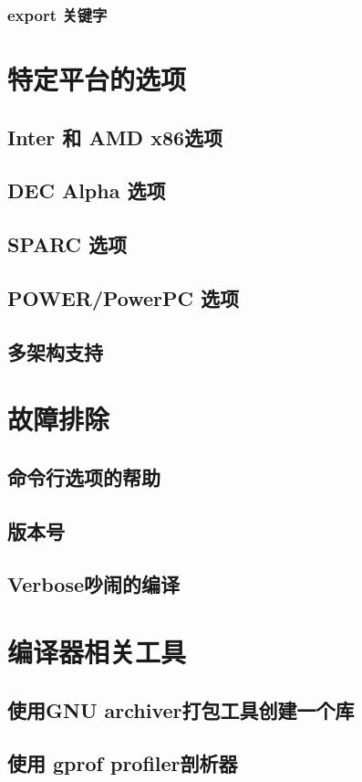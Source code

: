 \documentclass[lang=cn,10pt,newtx,scheme=chinese]{elegantbook}
\begin{document}
\subsection{export 关键字}

\chapter{特定平台的选项}
\section{Inter 和 AMD x86选项}
\section{DEC Alpha 选项}
\section{SPARC 选项}
\section{POWER/PowerPC 选项}
\section{多架构支持}

\chapter{故障排除}
\section{命令行选项的帮助}
\section{版本号}
\section{Verbose吵闹的编译}

\chapter{编译器相关工具}
\section{使用GNU archiver打包工具创建一个库}
\section{使用 gprof profiler剖析器}
\end{document}
